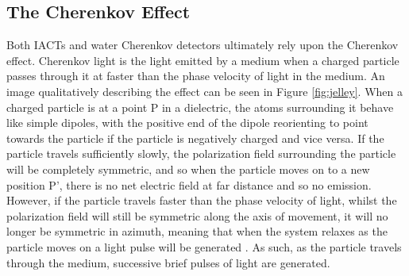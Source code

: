 \subsection{The Cherenkov Effect}
Both IACTs and water Cherenkov detectors ultimately rely upon the Cherenkov effect. Cherenkov light is the light emitted by a medium when a charged particle passes through it at faster than the phase velocity of light in the medium. An image qualitatively describing the effect can be seen in Figure \ref{fig:jelley}. When a charged particle is at a point P in a dielectric, the atoms surrounding it behave like simple dipoles, with the positive end of the dipole reorienting to point towards the particle if the particle is negatively charged and vice versa. If the particle travels sufficiently slowly, the polarization field surrounding the particle will be completely symmetric, and so when the particle moves on to a new position P', there is no net electric field at far distance and so no emission. However, if the particle travels faster than the phase velocity of light, whilst the polarization field will still be symmetric along the axis of movement, it will no longer be symmetric in azimuth, meaning that when the system relaxes as the particle moves on a light pulse will be generated \cite{jelley}. As such, as the particle travels through the medium, successive brief pulses of light are generated. 

